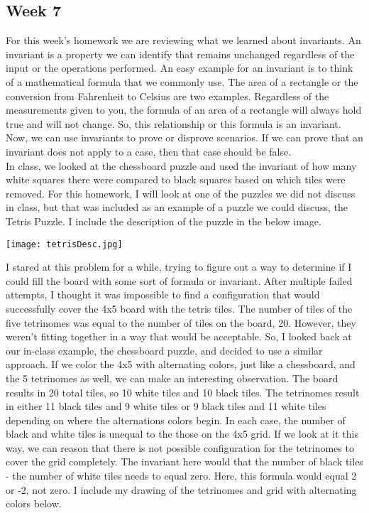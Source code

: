 \documentclass{article}
\theoremstyle{theorem}
\theoremstyle{definition}
\theoremstyle{remark}
\begin{document}
\subsection{Week 7}
For this week's homework we are reviewing what we learned about invariants. An invariant is a property we can identify that remains unchanged regardless of the input or the operations performed. An easy example for an invariant is to think of a mathematical 
formula that we commonly use. The area of a rectangle or the conversion from Fahrenheit to Celsius are two examples. Regardless of the measurements given to you, the formula of an area of a rectangle will always hold true and will not change. So, this relationship
or this formula is an invariant. Now, we can use invariants to prove or disprove scenarios. If we can prove that an invariant does not apply to a case, then that case should be false. \\

In class, we looked at the chessboard puzzle and used the invariant of how many white squares there were compared to black squares based on which tiles were removed. For this homework, I will look at one of the puzzles we did not discuss in class, but 
that was included as an example of a puzzle we could discuss, the Tetris Puzzle. I include the description of the puzzle in the below image. \\

\begin{center}
  \texttt{[image: tetrisDesc.jpg]}
\end{center}

I stared at this problem for a while, trying to figure out a way to determine if I could fill the board with some sort of formula or invariant. After multiple failed attempts, I thought it was impossible to find a configuration that would successfully cover the 
4x5 board with the tetris tiles. The number of tiles of the five tetrinomes was equal to the number of tiles on the board, 20. However, they weren't fitting together in a way that would be acceptable. So, I looked back at our in-class example, the chessboard 
puzzle, and decided to use a similar approach. If we color the 4x5 with alternating colors, just like a chessboard, and the 5 tetrinomes as well, we can make an interesting observation. The board results in 20 total tiles, so 10 white tiles and 10 black tiles. 
The tetrinomes result in either 11 black tiles and 9 white tiles or 9 black tiles and 11 white tiles depending on where the alternations colors begin. In each case, the number of black and white tiles is unequal to the those on the 4x5 grid. If we look at it this way, 
we can reason that there is not possible configuration for the tetrinomes to cover the grid completely. The invariant here would that the number of black tiles - the number of white tiles needs to equal zero. Here, this formula would equal 2 or -2, not zero. I include 
my drawing of the tetrinomes and grid with alternating colors below. \\
\end{document}

